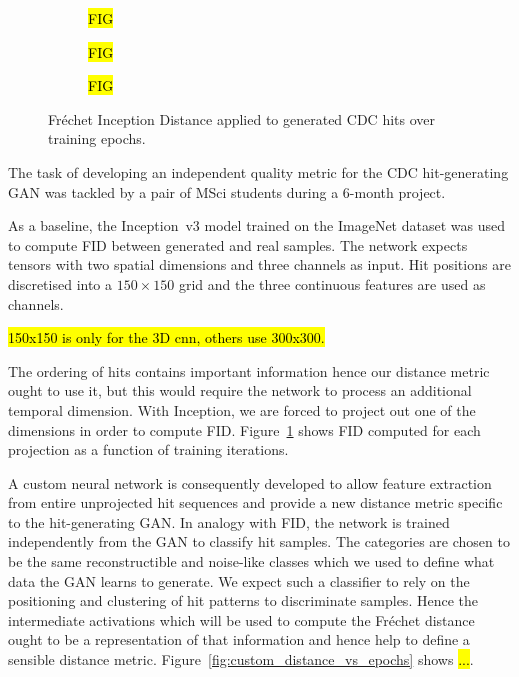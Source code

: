 \begin{figure}
    \centering
    \begin{subfigure}[t]{0.29\textwidth}
        \centering
        \hl{FIG}
        \caption{}
    \end{subfigure}
    \begin{subfigure}[t]{0.29\textwidth}
        \centering
        \hl{FIG}
        \caption{}
    \end{subfigure}
    \begin{subfigure}[t]{0.29\textwidth}
        \centering
        \hl{FIG}
        \caption{}
    \end{subfigure}
    \caption{Fréchet Inception Distance applied to generated CDC hits over training epochs.}
    \label{fig:FID_vs_epochs}
\end{figure}

The task of developing an independent quality metric for the CDC hit-generating
GAN was tackled by a pair of MSci students during a 6-month project. 

As a baseline, the Inception~v3 model trained on the ImageNet dataset was used
to compute FID between generated and real samples. The network expects tensors
with two spatial dimensions and three channels as input. Hit positions are
discretised into a $150 \times 150$ grid and the three continuous features are
used as channels. 

\hl{150x150 is only for the 3D cnn, others use 300x300.}

The ordering of hits contains important information hence our distance metric
ought to use it, but this would require the network to process an additional
temporal dimension. 
With Inception, we are forced to project out one of the dimensions in order
to compute FID. Figure~\ref{fig:FID_vs_epochs} shows FID computed for each
projection as a function of training iterations.

A custom neural network is consequently developed to allow feature extraction
from entire unprojected hit sequences and provide a new distance metric specific
to the hit-generating GAN. In analogy with FID, the network is trained
independently from the GAN to classify hit samples. The categories are chosen to
be the same reconstructible and noise-like classes which we used to define what
data the GAN learns to generate. We expect such a classifier to rely on the
positioning and clustering of hit patterns to discriminate samples. Hence the
intermediate activations which will be used to compute the Fréchet distance
ought to be a representation of that information and hence help to define a
sensible distance metric.
Figure~\ref{fig:custom_distance_vs_epochs} shows \hl{...}.

